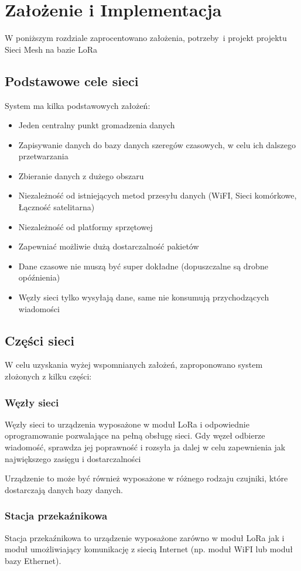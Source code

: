 \chapter{Założenie i Implementacja}
W poniższym rozdziale zaprocentowano założenia, potrzeby~i projekt projektu Sieci Mesh na bazie LoRa

\section{Podstawowe cele sieci}
System ma kilka podstawowych założeń:
\begin{itemize}
    \item Jeden centralny punkt gromadzenia danych
    \item Zapisywanie danych do bazy danych szeregów czasowych, w celu ich dalszego przetwarzania
    \item Zbieranie danych z dużego obszaru
    \item Niezależność od istniejących metod przesyłu danych (WiFI, Sieci komórkowe, Łączność satelitarna)
    \item Niezależność od platformy sprzętowej
    \item Zapewniać możliwie dużą dostarczalność pakietów
    \item Dane czasowe nie muszą być super dokładne (dopuszczalne są drobne opóźnienia)
    \item Węzły sieci tylko wysyłają dane, same nie konsumują przychodzących wiadomości
\end{itemize}

\section{Części sieci}
W celu uzyskania wyżej wspomnianych założeń, zaproponowano system złożonych z kilku części:
\subsection{Węzły sieci}
Węzły sieci to urządzenia wyposażone w moduł LoRa i odpowiednie oprogramowanie pozwalające na pełną obsługę sieci. Gdy węzeł odbierze wiadomość, sprawdza jej poprawność i rozsyła ja dalej w celu zapewnienia jak największego zasięgu i dostarczalności

Urządzenie to może być również wyposażone w różnego rodzaju czujniki, które dostarczają danych bazy danych.

\subsection{Stacja przekaźnikowa}
Stacja przekaźnikowa to urządzenie wyposażone zarówno w moduł LoRa jak i moduł umożliwiający komunikację z siecią Internet (np. moduł WiFI lub moduł bazy Ethernet).

